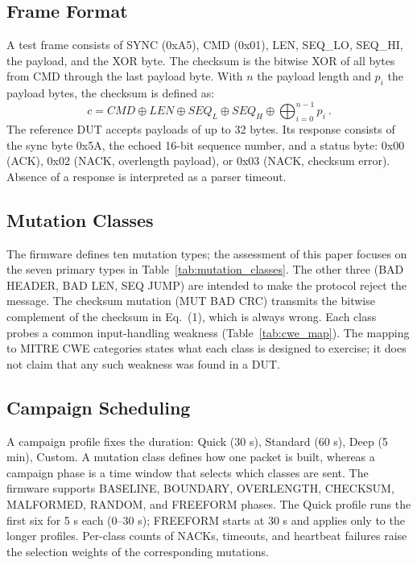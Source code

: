 \documentclass[10pt,letterpaper]{article}
\begin{document}
\subsection{Frame Format}
A test frame consists of SYNC (0xA5), CMD (0x01), LEN, SEQ\_LO, SEQ\_HI, the payload, and the XOR byte. The checksum is the bitwise XOR of all bytes from CMD through the last payload byte. With $n$ the payload length and $p_i$ the payload bytes, the checksum is defined as:
\begin{equation}
c = CMD \oplus LEN \oplus SEQ_L \oplus SEQ_H \oplus \bigoplus_{i=0}^{n-1} p_i~. \tag{1}
\end{equation}
The reference DUT accepts payloads of up to 32 bytes. Its response consists of the sync byte 0x5A, the echoed 16-bit sequence number, and a status byte: 0x00 (ACK), 0x02 (NACK, overlength payload), or 0x03 (NACK, checksum error). Absence of a response is interpreted as a parser timeout.

\subsection{Mutation Classes}
The firmware defines ten mutation types; the assessment of this paper focuses on the seven primary types in Table~\ref{tab:mutation_classes}. The other three (BAD HEADER, BAD LEN, SEQ JUMP) are intended to make the protocol reject the message. The checksum mutation (MUT BAD CRC) transmits the bitwise complement of the checksum in Eq.~(1), which is always wrong. Each class probes a common input-handling weakness (Table~\ref{tab:cwe_map}). The mapping to MITRE CWE categories states what each class is designed to exercise; it does not claim that any such weakness was found in a DUT.

\subsection{Campaign Scheduling}
A campaign profile fixes the duration: Quick (30 s), Standard (60 s), Deep (5 min), Custom. A mutation class defines how one packet is built, whereas a campaign phase is a time window that selects which classes are sent. The firmware supports BASELINE, BOUNDARY, OVERLENGTH, CHECKSUM, MALFORMED, RANDOM, and FREEFORM phases. The Quick profile runs the first six for 5 s each (0--30 s); FREEFORM starts at 30 s and applies only to the longer profiles. Per-class counts of NACKs, timeouts, and heartbeat failures raise the selection weights of the corresponding mutations.
\end{document}
